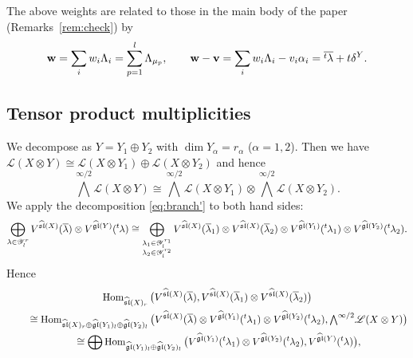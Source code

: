 \documentclass[pdftex]{sigma}
\theoremstyle{definition}
\numberwithin{equation}{section}
\newcommand{\remsref}[1]{Remarks~\ref{#1}}
\newcommand{\lsp}[2]{{\mskip-.3mu}{}^{#1}\mskip-1mu{#2}}
\newcommand{\algsl}{\operatorname{\mathfrak{sl}}} %
\newcommand{\gl}{\operatorname{\mathfrak{gl}}}
\newcommand{\Hom}{\operatorname{Hom}}
\newcommand{\bv}{{\mathbf v}} %
\newcommand{\bw}{{\mathbf w}} %
\newcommand{\Wedge}{{\textstyle \bigwedge}}
\begin{document}
The above weights are related to those in the main body of the paper
(\remsref{rem:check}) by
\begin{equation*}
   \bw = \sum_i w_i \Lambda_i = \sum_{p=1}^l \Lambda_{\mu_p}, \qquad
   \bw - \bv = \sum_i w_i \Lambda_i - v_i \alpha_i
    = \overline{\lsp{t}\lambda} + t \delta^Y.
\end{equation*}

\subsection{Tensor product multiplicities}

We decompose as $Y = Y_1\oplus Y_2$ with $\dim Y_\alpha = r_\alpha$
($\alpha=1,2$). Then we have
$\mathscr L(X\otimes Y) \cong \mathscr L(X\otimes Y_1)\oplus \mathscr
L(X\otimes Y_2)$ and hence
\begin{equation*}
   \Wedge^{\infty/2} \mathscr L(X\otimes Y)
   \cong
   \Wedge^{\infty/2} \mathscr L(X\otimes Y_1) \otimes
   \Wedge^{\infty/2} \mathscr L(X\otimes Y_2).
\end{equation*}
We apply the decomposition \eqref{eq:branch'} to both hand sides:
\begin{gather*}
  \bigoplus_{\lambda\in\mathscr Y^r_l}
  V^{\widehat{\algsl}(X)}(\overline\lambda)\otimes
  V^{\widehat{\gl}(Y)}(\lsp{t}\lambda)
 \cong
  \bigoplus_{\substack{\lambda_1\in\mathscr Y^{r_1}_l \\
      \lambda_2\in\mathscr Y^{r_2}_l}}
  V^{\widehat{\algsl}(X)}(\overline\lambda_1)\otimes
  V^{\widehat{\algsl}(X)}(\overline\lambda_2) \otimes
  V^{\widehat{\gl}(Y_1)}(\lsp{t}\lambda_1)\otimes
  V^{\widehat{\gl}(Y_2)}(\lsp{t}\lambda_2).
\end{gather*}
Hence
\begin{gather*}
  \Hom_{\widehat{\algsl}(X)_r}\big(V^{\widehat{\algsl}(X)}(\overline\lambda),
  V^{\widehat{\algsl}(X)}(\overline\lambda_1)\otimes
  V^{\widehat{\algsl}(X)}(\overline\lambda_2)\big)
\\
\qquad{}  \cong
  \Hom_{\widehat{\algsl}(X)_r\oplus\widehat{\gl}(Y_1)_l\oplus\widehat{\gl}(Y_2)_l}
  \big(V^{\widehat{\algsl}(X)}(\overline\lambda)\otimes
  V^{\widehat{\gl}(Y_1)}(\lsp{t}\lambda_1)
  \otimes V^{\widehat{\gl}(Y_2)}(\lsp{t}\lambda_2),
  \Wedge^{\infty/2} \mathscr L(X\otimes Y)\big)
\\
\qquad{}  \cong
  \bigoplus
    \Hom_{\widehat{\gl}(Y_1)_l\oplus\widehat{\gl}(Y_2)_l}
  \big(V^{\widehat{\gl}(Y_1)}(\lsp{t}\lambda_1)
  \otimes V^{\widehat{\gl}(Y_2)}(\lsp{t}\lambda_2),
  V^{\widehat{\gl}(Y)}(\lsp{t}\lambda)\big),
\end{gather*}
\end{document}
